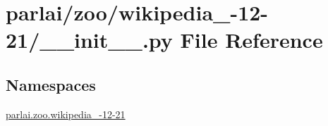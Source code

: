 \hypertarget{parlai_2zoo_2wikipedia__2016-12-21_2____init_____8py}{}\section{parlai/zoo/wikipedia\+\_-\/12-\/21/\+\_\+\+\_\+init\+\_\+\+\_\+.py File Reference}
\label{parlai_2zoo_2wikipedia__2016-12-21_2____init_____8py}
\subsection*{Namespaces}
\begin{DoxyCompactItemize}
\item 
 \hyperlink{namespaceparlai_1_1zoo_1_1wikipedia__2016-12-21}{parlai.\+zoo.\+wikipedia\+\_-\/12-\/21}
\end{DoxyCompactItemize}
